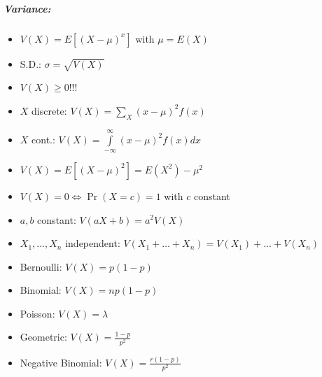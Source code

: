 \documentclass[landscape,10pt]{article}
\begin{document}
\begin{multicols}{4}
\subparagraph*{Variance: }
\begin{itemize}
    \item[] \(V(X) = E[(X-\mu)^x]\) with \(\mu = E(X)\)
    \item[] S.D.: \(\sigma = \sqrt{V(X)}\)
    \item[] \(V(X) \geq 0\)!!!
    \item[] \(X\) discrete: \(V(X) = \sum\limits_X{(x-\mu)^2f(x)}\)
    \item[] \(X\) cont.: \(V(X) = \int\limits_{-\infty}^{\infty}{(x-\mu)^2f(x)dx}\)
    \item[] \(V(X) = E[(X-\mu)^2] = E(X^2) - \mu^2\)
    \item[] \(V(X) = 0 \iff \Pr(X = c) = 1\) with \(c\) constant
    \item[] \(a, b\) constant: \(V(aX+b) = a^2V(X)\)
    \item[] \(X_1,\ldots,X_n\) independent: \(V(X_1+\ldots+X_n) = V(X_1)+ \ldots + V(X_n)\)
    \item[] Bernoulli: \(V(X) = p(1-p)\)
    \item[] Binomial: \(V(X) = np(1-p)\)
    \item[] Poisson: \(V(X) = \lambda\)
    \item[] Geometric: \(V(X) = \frac{1-p}{p^2}\)
    \item[] Negative Binomial: \(V(X) = \frac{r(1-p)}{p^2}\)
\end{itemize}


\end{multicols}
\end{document}

